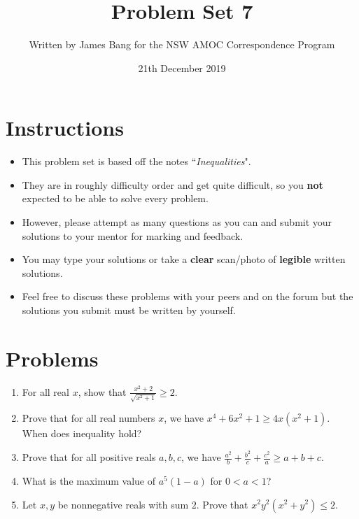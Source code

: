\documentclass[A4 paper]{article}
\title{Problem Set 7}
\author{Written by James Bang for the NSW AMOC Correspondence Program}
\date{21th December 2019}
\begin{document}
 
\maketitle
\thispagestyle{empty}
\section*{Instructions}
\begin{itemize}
\item This problem set is based off the notes ``\textit{Inequalities}". 
\item They are in roughly difficulty order and get quite difficult, so you \textbf{not} expected to be able to solve every problem. 
\item However, please attempt as many questions as you can and submit your solutions to your mentor for marking and feedback.
\item You may type your solutions or take a \textbf{clear} scan/photo of \textbf{legible} written solutions.
\item Feel free to discuss these problems with your peers and on the forum but the solutions you submit must be written by yourself.
\end{itemize}
\section*{Problems}
\begin{enumerate}
	\item For all real $x$, show that $\displaystyle \frac{x^2+2}{\sqrt{x^2+1}}\geqslant 2.$
	\item Prove that for all real numbers $x$, we have $x^4+6x^2+1\geqslant 4x(x^2+1)$. When does inequality hold?
	\item Prove that for all positive reals $a,b,c$, we have $\displaystyle \frac{a^2}{b}+\frac{b^2}{c}+\frac{c^2}{a}\geqslant a+b+c$.
	\item What is the maximum value of $a^5(1-a)$ for $0<a<1$?
	\item Let $x,y$ be nonnegative reals with sum $2$. Prove that $x^2y^2(x^2+y^2)\leqslant 2$.
\end{enumerate}
\end{document}

